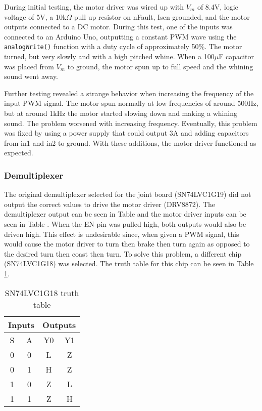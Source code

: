 \noindent During initial testing, the motor driver was wired up with $V_m$ of 8.4V, logic voltage of 5V, a 10k$\Omega$ pull up resistor on nFault, Isen grounded, and the motor outputs connected to a DC motor. During this test, one of the inputs was connected to an Arduino Uno, outputting a constant PWM wave using the \texttt{analogWrite()} function with a duty cycle of approximately 50\%. The motor turned, but very slowly and with a high pitched whine. When a 100$\mu$F capacitor was placed from $V_m$ to ground, the motor spun up to full speed and the whining sound went away.

\noindent Further testing revealed a strange behavior when increasing the frequency of the input PWM signal. The motor spun normally at low frequencies of around 500Hz, but at around 1kHz the motor started slowing down and making a whining sound. The problem worsened with increasing frequency. Eventually, this problem was fixed by using a power supply that could output 3A and adding capacitors from in1 and in2 to ground. With these additions, the motor driver functioned as expected.


\subsubsection{Demultiplexer}
The original demultiplexer selected for the joint board (SN74LVC1G19) did not output the correct values to drive the motor driver (DRV8872). The demultiplexer output can be seen in Table  and the motor driver inputs can be seen in Table . When the EN pin was pulled high, both outputs would also be driven high. This effect is undesirable since, when given a PWM signal, this would cause the motor driver to turn then brake then turn again as opposed to the desired turn then coast then turn. To solve this problem, a different chip (SN74LVC1G18) was selected. The truth table for this chip can be seen in Table \ref{tbl:sn74lvc1g18-truth}.
\begin{table}[H]
	\centering
	\caption{SN74LVC1G18 truth table}
	\begin{tabular}{| c  c | c  c| }
		\hline
		\multicolumn{2}{|c|}{Inputs} & \multicolumn{2}{c|}{Outputs} \\
		\hline
		S & A & Y0 & Y1 \\
		\hline
		0 & 0 & L & Z \\
		0 & 1 & H & Z \\
		1 & 0 & Z & L \\
		1 & 1 & Z & H \\
		\hline
	\end{tabular}
	\label{tbl:sn74lvc1g18-truth}
\end{table}

